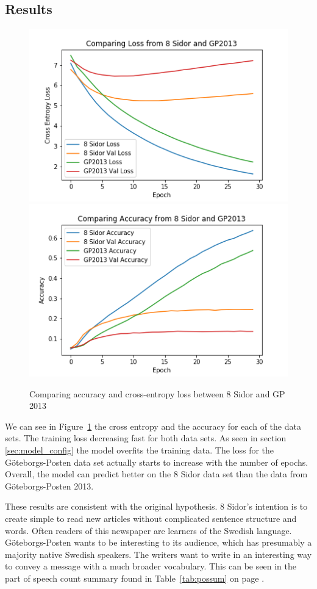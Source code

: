 \documentclass[11pt,a4paper]{article}
\begin{document}
\subsection{Results}

\begin{figure}[h!]
\centering
\includegraphics[scale=0.5]{compare_atta_gp_loss.png}
\includegraphics[scale=0.5]{compare_atta_gp_acc.png}
\caption{Comparing accuracy and cross-entropy loss between 8 Sidor and GP 2013}
\label{fig:atta_gp2013_compare}
\end{figure}

We can see in Figure~\ref{fig:atta_gp2013_compare} the cross entropy and the accuracy for each of the data sets. 
The training loss decreasing fast for both data sets.
As seen in section \ref{sec:model_config} the model overfits the training data.
The loss for the Göteborgs-Posten data set actually starts to increase with the number of epochs.
Overall, the model can predict better on the 8 Sidor data set than the data from Göteborgs-Posten 2013.

These results are consistent with the original hypothesis.
8 Sidor's intention is to create simple to read new articles without complicated sentence structure and words.
Often readers of this newspaper are learners of the Swedish language.
Göteborgs-Posten wants to be interesting to its audience, which has presumably a majority native Swedish speakers.
The writers want to write in an interesting way to convey a message with a much broader vocabulary.
This can be seen in the part of speech count summary found in Table~\ref{tab:possum} on page \pageref{tab:possum}.
\end{document}
